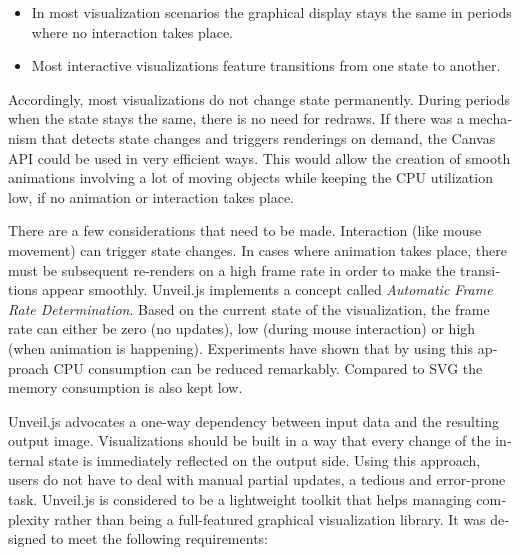 \begin{english}
\begin{itemize}
\item
  In most visualization scenarios the graphical display stays the same in periods where no interaction takes place.
\item
  Most interactive visualizations feature transitions from one state to another.
\end{itemize}

Accordingly, most visualizations do not change state permanently. During periods when the state stays the same, there is no need for redraws. If there was a mechanism that detects state changes and triggers renderings on demand, the Canvas API could be used in very efficient ways. This would allow the creation of smooth animations involving a lot of moving objects while keeping the CPU utilization low, if no animation or interaction takes place.

There are a few considerations that need to be made. Interaction (like mouse movement) can trigger state changes. In cases where animation takes place, there must be subsequent re-renders on a high frame rate in order to make the transitions appear smoothly. Unveil.js implements a concept called \emph{Automatic Frame Rate Determination}. Based on the current state of the visualization, the frame rate can either be zero (no updates), low (during mouse interaction) or high (when animation is happening). Experiments have shown that by using this approach CPU consumption can be reduced remarkably. Compared to SVG the memory consumption is also kept low.

Unveil.js advocates a one-way dependency between input data and the resulting output image. Visualizations should be built in a way that every change of the internal state is immediately reflected on the output side. Using this approach, users do not have to deal with manual partial updates, a tedious and error-prone task. Unveil.js is considered to be a lightweight toolkit that helps managing complexity rather than being a full-featured graphical visualization library. It was designed to meet the following requirements:


\end{english}
